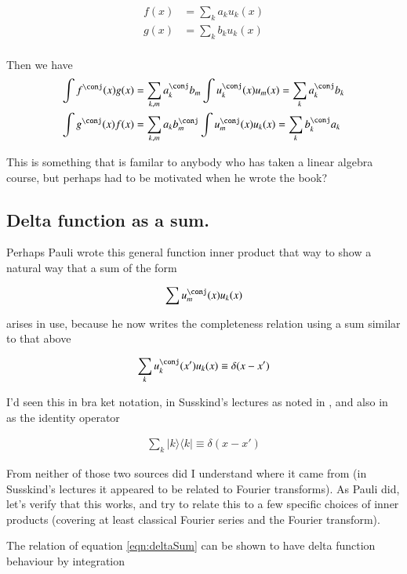 \documentclass{article}
\newcommand{\ket}[1]{\lvert {#1} \rangle}
\newcommand{\bra}[1]{\langle {#1} \rvert}
\newcommand{\ketbra}[2]{\ket{#1}\bra{#2}}
\begin{document}
\begin{align*}
f(x) &= \sum_k a_k u_k(x) \\
g(x) &= \sum_k b_k u_k(x) \\
\end{align*}

Then we have 
\begin{align*}
\int f^\conj(x) g(x) &= \sum_{k,m} a_k^\conj b_m \int u_k^\conj(x) u_m(x) = \sum_k a_k^\conj b_k \\
\int g^\conj(x) f(x) &= \sum_{k,m} a_k b_m^\conj \int u_m^\conj(x) u_k(x) = \sum_k b_k^\conj a_k \\
\end{align*}

This is something that is familar to anybody who has taken a linear
algebra course, but perhaps had to be motivated when he wrote the book?

\subsection{ Delta function as a sum. }

Perhaps Pauli wrote this general function inner product that way to show a natural way that a sum of the
form

\begin{align*}
\sum u_m^\conj(x) u_k(x)
\end{align*}

arises in use, because he now writes the completeness relation using a sum similar to that above

\begin{align}\label{eqn:deltaSum}
\sum_{k} u_k^\conj(x') u_k(x) \equiv \delta(x-x') 
\end{align}

I'd seen this in bra ket notation, in Susskind's lectures as noted in \cite{PJQmSusskind}, and also in \cite{mcmahon2005qmd} as the
identity operator

\begin{align}
\sum_{k} \ketbra{k}{k} \equiv \delta(x-x') 
\end{align}

From neither of those two sources did I understand where it came from (in Susskind's lectures it appeared to be
related to Fourier transforms).
As Pauli did, let's verify that this works, and try to relate this to a few specific choices of inner products (covering at
least classical Fourier series and the Fourier transform).

The relation of equation \ref{eqn:deltaSum} can be shown to have delta function behaviour by integration
\end{document}
